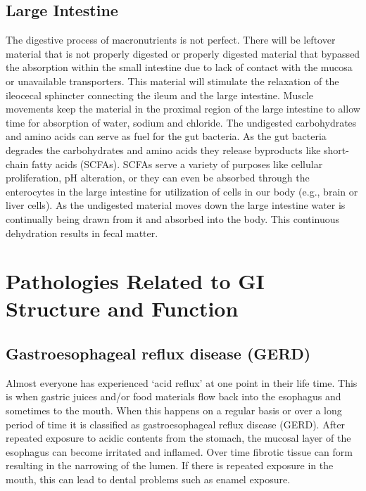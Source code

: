 \documentclass{tufte-handout}
\begin{document}
\subsection{Large Intestine}
The digestive process of macronutrients is not perfect. There will be leftover material that is not properly digested or properly digested material that bypassed the absorption within the small intestine due to lack of contact with the mucosa or unavailable transporters. This material will stimulate the relaxation of the ileocecal sphincter connecting the ileum and the large intestine. Muscle movements keep the material in the proximal region of the large intestine to allow time for absorption of water, sodium and chloride. The undigested carbohydrates and amino acids can serve as fuel for the gut bacteria. As the gut bacteria degrades the carbohydrates and amino acids they release byproducts like short-chain fatty acids (SCFAs). SCFAs serve a variety of purposes like cellular proliferation, pH alteration, or they can even be absorbed through the enterocytes in the large intestine for utilization of cells in our body (e.g., brain or liver cells). As the undigested material moves down the large intestine water is continually being drawn from it and absorbed into the body. This continuous dehydration results in fecal matter. 

\section{Pathologies Related to GI Structure and Function}

\subsection{Gastroesophageal reflux disease (GERD)}
Almost everyone has experienced ‘acid reflux' at one point in their life time. This is when gastric juices and/or food materials flow back into the esophagus and sometimes to the mouth. When this happens on a regular basis or over a long period of time it is classified as gastroesophageal reflux disease (GERD). After repeated exposure to acidic contents from the stomach, the mucosal layer of the esophagus can become irritated and inflamed. Over time fibrotic tissue can form resulting in the narrowing of the lumen. If there is repeated exposure in the mouth, this can lead to dental problems such as enamel exposure. 
\end{document}
